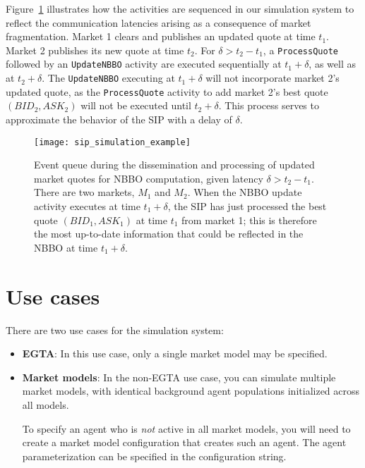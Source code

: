 \documentclass[11pt]{article}
\newcommand{\bid}{\ensuremath{\mathit BID}}
\newcommand{\ask}{\ensuremath{\mathit ASK}}
\begin{document}
Figure~\ref{fig:simsystem} illustrates how the activities are sequenced in our simulation system to reflect the communication latencies arising as a consequence of market fragmentation.
Market 1 clears and publishes an updated quote at time $t_1$. Market 2 publishes its new quote at time $t_2$. For $\delta > t_2 - t_1$, a \verb|ProcessQuote| followed by an \verb|UpdateNBBO| activity are executed sequentially at $t_1 + \delta$, as well as at $t_2 + \delta$. The \verb|UpdateNBBO| executing at $t_1+\delta$ will not incorporate market 2's updated quote, as the \verb|ProcessQuote| activity to add market 2's best quote $(\bid_{2} , \ask_{2})$ will not be executed until $t_2 + \delta$.
This process serves to approximate the behavior of the SIP with a delay of $\delta$.

\begin{figure}
  \centering
  \texttt{[image: sip\_simulation\_example]}
  \caption{Event queue during the dissemination and processing of updated market quotes for NBBO computation, given latency $\delta > t_2 - t_1$.
  There are two markets, $M_1$ and $M_2$. When the NBBO update activity executes at time $t_1 + \delta$, the SIP has just processed the best quote $(\bid_{1} , \ask_{1})$ at time $t_1$ from market 1; this is therefore the most up-to-date information that could be reflected in the NBBO at time $t_1 + \delta$.}
  \label{fig:simsystem}
\end{figure}

\section{Use cases}

There are two use cases for the simulation system:

\begin{itemize}
\item \textbf{EGTA}: In this use case, only a single market model may be specified.

\item \textbf{Market models}:
In the non-EGTA use case, you can simulate multiple market models, with identical background agent populations initialized across all models.

To specify an agent who is \emph{not} active in all market models, you will need to create a market model configuration that creates such an agent. The agent parameterization can be specified in the configuration string.

\end{itemize}
\end{document}
